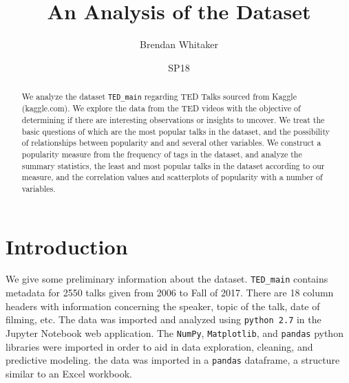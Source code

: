 \documentclass[11pt,oneside,reqno]{amsart}
\theoremstyle{plain}
\theoremstyle{definition}
\theoremstyle{remark}
\newcommand{\inlinecode}{\texttt}
\begin{document}
\begin{abstract}
We analyze the dataset \inlinecode{TED\_main} regarding TED Talks sourced from Kaggle (kaggle.com). We explore the data from the TED videos with the objective of determining if there are interesting observations or insights to uncover. We treat the basic questions of which are the most popular talks in the dataset, and the possibility of relationships between popularity and and several other variables. We construct a popularity measure from the frequency of tags in the dataset, and analyze the summary statistics, the least and most popular talks in the dataset according to our measure, and the correlation values and scatterplots of popularity with a number of variables. 
\end{abstract}
\title{An Analysis of the  Dataset}
\date{SP18}
\author[Brendan Whitaker]{Brendan Whitaker}
\maketitle
\tableofcontents

\section{Introduction}

We give some preliminary information about the dataset. \inlinecode{TED\_main} contains metadata for 2550 talks given from 2006 to Fall of 2017. There are 18 column headers with information concerning the speaker, topic of the talk, date of filming, etc. The data was imported and analyzed using \inlinecode{python 2.7} in the Jupyter Notebook web application. The \inlinecode{NumPy}, \inlinecode{Matplotlib}, and \inlinecode{pandas} python libraries were imported in order to aid in data exploration, cleaning, and predictive modeling. the data was imported in a \inlinecode{pandas} dataframe, a structure similar to an Excel workbook.  
\end{document}
